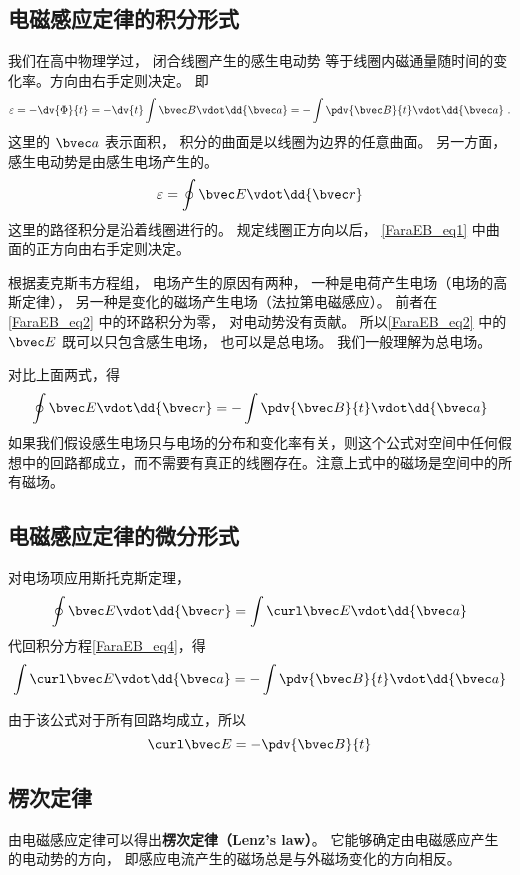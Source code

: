
\begin{issues}
\issueAbstract
\issueTODO
\end{issues}


\subsection{电磁感应定律的积分形式}

我们在高中物理学过， 闭合线圈产生的感生电动势 %
等于线圈内磁通量随时间的变化率。方向由右手定则决定。 即
\begin{equation}\label{FaraEB_eq1}
\varepsilon  =  -\dv{\Phi}{t} =  - \dv{t} \int \bvec B \vdot \dd{\bvec a} =  - \int \pdv{\bvec B}{t} \vdot \dd{\bvec a}~.
\end{equation} 
这里的 $\bvec a$ 表示面积， 积分的曲面是以线圈为边界的任意曲面。 另一方面，感生电动势是由感生电场产生的。 
\begin{equation}\label{FaraEB_eq2}
\varepsilon  = \oint \bvec E \vdot \dd{\bvec r}
\end{equation}
这里的路径积分是沿着线圈进行的。 规定线圈正方向以后， \autoref{FaraEB_eq1} 中曲面的正方向由右手定则决定。

根据麦克斯韦方程组， 电场产生的原因有两种， 一种是电荷产生电场（电场的高斯定律）， 另一种是变化的磁场产生电场（法拉第电磁感应）。 前者在\autoref{FaraEB_eq2} 中的环路积分为零， 对电动势没有贡献。 所以\autoref{FaraEB_eq2} 中的 $\bvec E$ 既可以只包含感生电场， 也可以是总电场。 我们一般理解为总电场。

对比上面两式，得
\begin{equation}\label{FaraEB_eq4}
\oint \bvec E \vdot \dd{\bvec r}  =  - \int \pdv{\bvec B}{t} \vdot \dd{\bvec a} 
\end{equation} 
如果我们假设感生电场只与电场的分布和变化率有关，则这个公式对空间中任何假想中的回路都成立，而不需要有真正的线圈存在。注意上式中的磁场是空间中的所有磁场。

\subsection{电磁感应定律的微分形式}

对电场项应用斯托克斯定理， 
\begin{equation}
\oint \bvec E \vdot \dd{\bvec r}  = \int \curl \bvec E \vdot \dd{\bvec a}
\end{equation}
代回积分方程\autoref{FaraEB_eq4}，得
\begin{equation}
\int \curl \bvec E \vdot\dd{\bvec a}  =  - \int \pdv{\bvec B}{t} \vdot \dd{\bvec a} 
\end{equation} 

由于该公式对于所有回路均成立，所以
\begin{equation}\label{FaraEB_eq3}
\curl \bvec E =  - \pdv{\bvec B}{t}
\end{equation} 

\subsection{楞次定律}
由电磁感应定律可以得出\textbf{楞次定律（Lenz's law）}。 它能够确定由电磁感应产生的电动势的方向， 即感应电流产生的磁场总是与外磁场变化的方向相反。 
